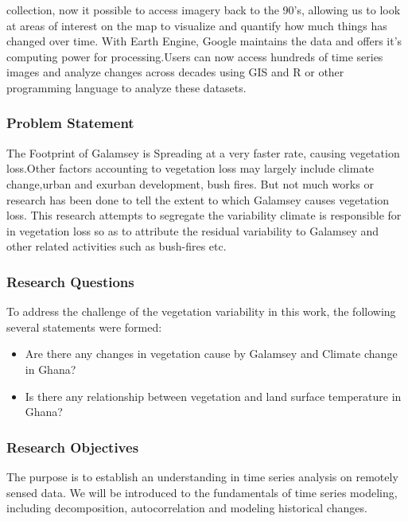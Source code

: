 \documentclass[
  letterpaper,
  DIV=11,
  numbers=noendperiod]{scrartcl}
\begin{document}
collection, now it possible to access imagery back to the 90's, allowing
us to look at areas of interest on the map to visualize and quantify how
much things has changed over time. With Earth Engine, Google maintains
the data and offers it's computing power for processing.Users can now
access hundreds of time series images and analyze changes across decades
using GIS and R or other programming language to analyze these datasets.

\hypertarget{problem-statement}{%
\subsubsection{Problem Statement}\label{problem-statement}}

The Footprint of Galamsey is Spreading at a very faster rate, causing
vegetation loss.Other factors accounting to vegetation loss may largely
include climate change,urban and exurban development, bush fires. But
not much works or research has been done to tell the extent to which
Galamsey causes vegetation loss. This research attempts to segregate the
variability climate is responsible for in vegetation loss so as to
attribute the residual variability to Galamsey and other related
activities such as bush-fires etc.

\hypertarget{research-questions}{%
\subsubsection{Research Questions}\label{research-questions}}

To address the challenge of the vegetation variability in this work, the
following several statements were formed:

\begin{itemize}
\item
  Are there any changes in vegetation cause by Galamsey and Climate
  change in Ghana?
\item
  Is there any relationship between vegetation and land surface
  temperature in Ghana?
\end{itemize}

\hypertarget{research-objectives}{%
\subsubsection{Research Objectives}\label{research-objectives}}

The purpose is to establish an understanding in time series analysis on
remotely sensed data. We will be introduced to the fundamentals of time
series modeling, including decomposition, autocorrelation and modeling
historical changes.
\end{document}
